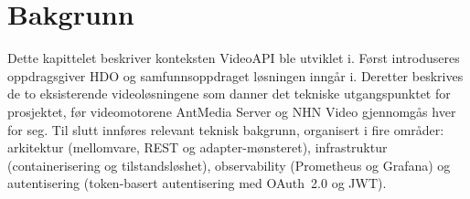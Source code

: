\chapter{Bakgrunn}
\label{ch:bakgrunn}

Dette kapittelet beskriver konteksten VideoAPI ble utviklet i. Først introduseres oppdragsgiver HDO og samfunnsoppdraget løsningen inngår i. Deretter beskrives de to eksisterende videoløsningene som danner det tekniske utgangspunktet for prosjektet, før videomotorene AntMedia Server og NHN Video gjennomgås hver for seg. Til slutt innføres relevant teknisk bakgrunn, organisert i fire områder: arkitektur (\gls{mellomvare}, REST og adapter-mønsteret), infrastruktur (containerisering og tilstandsløshet), observability (Prometheus og Grafana) og autentisering (\gls{token}-basert autentisering med OAuth~2.0 og JWT).











